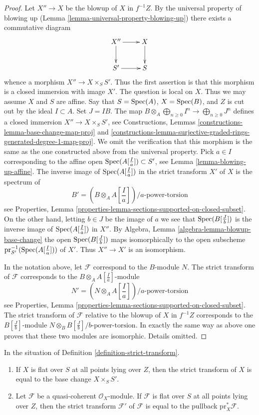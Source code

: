 \begin{proof}
Let $X'' \to X$ be the blowup of $X$ in $f^{-1}Z$. By the universal
property of blowing up (Lemma \ref{lemma-universal-property-blowing-up})
there exists a commutative diagram
$$
\xymatrix{
X'' \ar[r] \ar[d] & X \ar[d] \\
S' \ar[r] & S
}
$$
whence a morphism $X'' \to X \times_S S'$. Thus the first assertion
is that this morphism is a closed immersion with image $X'$.
The question is local on $X$. Thus we may assume $X$
and $S$ are affine. Say that $S = \mathop{\mathrm{Spec}}(A)$, $X = \mathop{\mathrm{Spec}}(B)$, and $Z$
is cut out by the ideal $I \subset A$. Set $J = IB$. The map
$B \otimes_A \bigoplus_{n \geq 0} I^n \to \bigoplus_{n \geq 0} J^n$
defines a closed immersion $X'' \to X \times_S S'$, see
Constructions, Lemmas
\ref{constructions-lemma-base-change-map-proj} and
\ref{constructions-lemma-surjective-graded-rings-generated-degree-1-map-proj}.
We omit the verification that this morphism is the same as the
one constructed above from the universal property.
Pick $a \in I$ corresponding to the affine open
$\mathop{\mathrm{Spec}}(A[\frac{I}{a}]) \subset S'$, see Lemma \ref{lemma-blowing-up-affine}.
The inverse image of $\mathop{\mathrm{Spec}}(A[\frac{I}{a}])$ in the strict transform
$X'$ of $X$ is the spectrum of
$$
B' = (B \otimes_A A[\textstyle{\frac{I}{a}}])/a\text{-power-torsion}
$$
see Properties, Lemma
\ref{properties-lemma-sections-supported-on-closed-subset}.
On the other hand, letting $b \in J$ be the image of $a$ we see that
$\mathop{\mathrm{Spec}}(B[\frac{J}{b}])$ is the inverse image of $\mathop{\mathrm{Spec}}(A[\frac{I}{a}])$
in $X''$. By Algebra, Lemma \ref{algebra-lemma-blowup-base-change}
the open $\mathop{\mathrm{Spec}}(B[\frac{J}{b}])$ maps isomorphically to the open subscheme
$\text{pr}_{S'}^{-1}(\mathop{\mathrm{Spec}}(A[\frac{I}{a}]))$ of $X'$.
Thus $X'' \to X'$ is an isomorphism.

\medskip\noindent
In the notation above, let $\mathcal{F}$ correspond to the $B$-module $N$.
The strict transform of $\mathcal{F}$ corresponds to the
$B \otimes_A A[\frac{I}{a}]$-module
$$
N' = (N \otimes_A A[\textstyle{\frac{I}{a}}])/a\text{-power-torsion}
$$
see Properties, Lemma
\ref{properties-lemma-sections-supported-on-closed-subset}.
The strict transform of $\mathcal{F}$ relative to the blowup of
$X$ in $f^{-1}Z$ corresponds to the $B[\frac{J}{b}]$-module
$N \otimes_B B[\frac{J}{b}]/b\text{-power-torsion}$. In exactly the same
way as above one proves that these two modules are isomorphic.
Details omitted.
\end{proof}

\begin{lemma}
\label{lemma-strict-transform-flat}
In the situation of Definition \ref{definition-strict-transform}.
\begin{enumerate}
\item If $X$ is flat over $S$ at all points lying over $Z$, then
the strict transform of $X$ is equal to the base change $X \times_S S'$.
\item Let $\mathcal{F}$ be a quasi-coherent $\mathcal{O}_X$-module.
If $\mathcal{F}$ is flat over $S$ at all points lying over $Z$, then
the strict transform $\mathcal{F}'$ of $\mathcal{F}$ is equal to the
pullback $\text{pr}_X^*\mathcal{F}$.
\end{enumerate}
\end{lemma}

